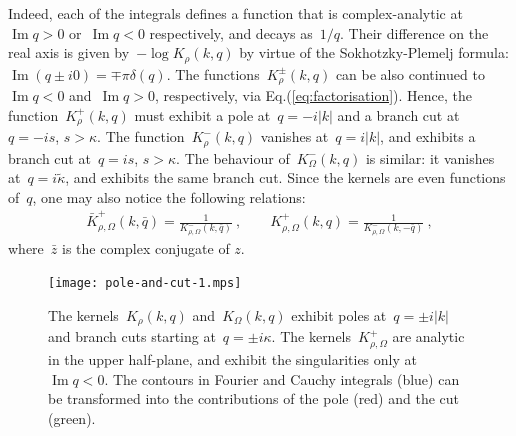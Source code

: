 \documentclass[preprint,aps,eqsecnum]{revtex4-1}
\newcommand{\fplus}[1]{{#1}^{+}}
\newcommand{\fminus}[1]{{#1}^{-}}
\newcommand{\fplusminus}[1]{{#1}^{\pm}}
\renewcommand{\Im}{\mathop{\mathrm{Im}}\nolimits}
\begin{document}
Indeed, each of the integrals defines a function that is complex-analytic
at~\mbox{$\Im q > 0$} or~\mbox{$\Im q < 0$} respectively,
and decays as~$1/q$.
Their difference on the real axis is given by~$-\log K_\rho(k, q)$ by virtue
of the Sokhotzky-Plemelj formula: $\Im (q \pm  i0) = \mp\pi \delta(q)$.
The functions~$\fplusminus{K}_\rho(k, q)$
can be also continued to~$\Im q < 0$ and~$\Im q > 0$, respectively,
via Eq.(\ref{eq:factorisation}). Hence, the function~$\fplus{K}_\rho(k, q)$ must
exhibit a pole at~$q = -i |k|$ and a branch cut at~$q = -is$, $s > \kappa$.
The function~$\fminus{K}_\rho(k, q)$ vanishes at~$q = i |k|$,
and exhibits a branch cut at~$q = i s$, $s > \kappa$.
The behaviour of~$\fminus{K}_\Omega(k, q)$ is similar:
it vanishes at~$q = i \tilde{\kappa}$,
and exhibits the same branch cut.
Since the kernels are even functions of~$q$, one may also
notice the following relations:
\begin{align}
\fplus{\bar{K}}_{\rho, \Omega}(k, \bar{q})
= \frac{1}{\fminus{K}_{\rho, \Omega}(k, {\bar q})} \ , \qquad
\fplus{K}_{\rho, \Omega}(k, q)
= \frac{1}{\fminus{K}_{\rho, \Omega}(k, -{\bar q})} \ ,
\end{align}
where~${\bar z}$ is the complex conjugate of
$z$.

\begin{figure}
  \texttt{[image: pole-and-cut-1.mps]}
  \caption{
   \label{fig:contours}
   The kernels~$K_\rho(k, q)$ and~$K_\Omega(k, q)$ exhibit poles
   at~$q = \pm i |k|$ and branch cuts starting at~$q = \pm i \kappa$.
   The kernels~$\fplus{K}_{\rho, \Omega}$ are analytic in the upper half-plane,
   and exhibit the singularities only at~$\Im q < 0$.
   The contours in Fourier and Cauchy integrals (blue)  can be transformed
   into the contributions of the pole (red) and the cut (green).}
\end{figure}
\end{document}
